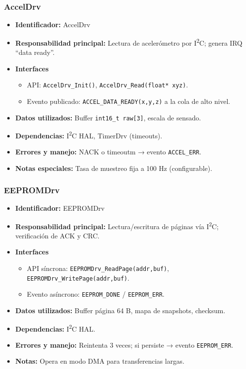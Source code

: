 \documentclass[11pt,a4paper]{article}
\begin{document}
\subsubsection{AccelDrv}
\begin{itemize}
  \item \textbf{Identificador:} AccelDrv
  \item \textbf{Responsabilidad principal:} Lectura de acelerómetro por I\textsuperscript{2}C; genera IRQ “data ready”.
  \item \textbf{Interfaces}
    \begin{itemize}
      \item API: \texttt{AccelDrv\_Init()}, \texttt{AccelDrv\_Read(float* xyz)}.
      \item Evento publicado: \texttt{ACCEL\_DATA\_READY(x,y,z)} a la cola de alto nivel.
    \end{itemize}
  \item \textbf{Datos utilizados:} Buffer \texttt{int16\_t raw[3]}, escala de sensado.
  \item \textbf{Dependencias:} I\textsuperscript{2}C HAL, TimerDrv (timeouts).
  \item \textbf{Errores y manejo:} NACK o timeoutm → evento \texttt{ACCEL\_ERR}.
  \item \textbf{Notas especiales:} Tasa de muestreo fija a 100 Hz (configurable).
\end{itemize}

\subsubsection{EEPROMDrv}
\begin{itemize}
  \item \textbf{Identificador:} EEPROMDrv
  \item \textbf{Responsabilidad principal:} Lectura/escritura de páginas vía I\textsuperscript{2}C; verificación de ACK y CRC.
  \item \textbf{Interfaces}
    \begin{itemize}
      \item API síncrona: \texttt{EEPROMDrv\_ReadPage(addr,\*buf)}, \texttt{EEPROMDrv\_WritePage(addr,\*buf)}.
      \item Evento asíncrono: \texttt{EEPROM\_DONE} / \texttt{EEPROM\_ERR}.
    \end{itemize}
  \item \textbf{Datos utilizados:} Buffer página 64 B, mapa de snapshots, checksum.
  \item \textbf{Dependencias:} I\textsuperscript{2}C HAL.
  \item \textbf{Errores y manejo:} Reintenta 3 veces; si persiste → evento \texttt{EEPROM\_ERR}.
  \item \textbf{Notas:} Opera en modo DMA para transferencias largas.
\end{itemize}
\end{document}
